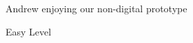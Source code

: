 \documentclass[]{article}
\begin{document}
\begin{figure}[!htb]
\begin{center}

\end{center}
\caption{Andrew enjoying our non-digital prototype \label{andrew}}
\end{figure}


\begin{figure}[!htb]
\begin{center}
\leavevmode
{}
\end{center}
\caption{Easy Level \label{level_easy}}
\end{figure}
\end{document}
